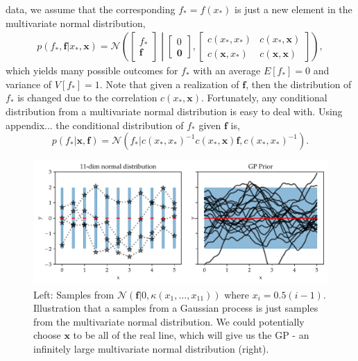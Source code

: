     data, we assume that the corresponding $f_* = f(x_*)$ is just a new element in the multivariate
    normal distribution, 
\begin{align}\label{prior_gp}
    p(f_*,\textbf{f}|x_*,\textbf{x}) = \mathcal{N}\left(\begin{bmatrix}
        f_*\\ \textbf{f}
    \end{bmatrix} \middle| \begin{bmatrix}
        0\\ \textbf{0}
    \end{bmatrix}, \begin{bmatrix}
        c(x_*, x_*) & c(x_*,\textbf{x})\\
        c(\textbf{x}, x_*) & c(\textbf{x}, \textbf{x})
    \end{bmatrix} \right), 
\end{align}
which yields many possible outcomes for $f_*$ with an average $E[f_*] = 0$ and variance of $V[f_*] =
1$. Note that given a realization of $\textbf{f}$, then the distribution of $f_*$ is changed due to
the correlation $c(x_*, \textbf{x})$. Fortunately, any conditional distribution from a multivariate
normal distribution is easy to deal with. Using appendix... the conditional distribution of $f_*$ given $\textbf{f}$ is, 
\begin{equation} \label{conditional_GP}
    p(f_*|\textbf{x}, \textbf{f}) = \mathcal{N}(f_*|c(x_*, x_*)^{-1}c(x_*, \textbf{x})\textbf{f},c(x_*, x_*)^{-1}).
\end{equation}
\begin{figure}
    \centering
    \includegraphics[width = \textwidth]{Pictures/GP_samples_mattern.pdf}
    \caption{Left: Samples from $\mathcal{N}(\textbf{f}|0,\kappa(x_1,\dots, x_{11}))$ where
    $x_i= 0.5(i-1)$. Illustration that a samples from a Gaussian process is just
    samples from the multivariate normal distribution. We could potentially choose
    $\textbf{x}$ to be all of the real line, which will give us the GP - an infinitely
    large multivariate normal distribution (right).}
    \label{GP_illustration}
\end{figure}

